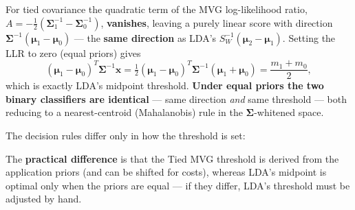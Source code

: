 For tied covariance the quadratic term of the MVG log-likelihood ratio, $A=-\tfrac12(\boldsymbol{\Sigma}_1^{-1}-\boldsymbol{\Sigma}_0^{-1})$, \textbf{vanishes}, leaving a purely linear score with direction $\boldsymbol{\Sigma}^{-1}(\boldsymbol{\mu}_1-\boldsymbol{\mu}_0)$ --- the \textbf{same direction} as LDA's $S_W^{-1}(\boldsymbol{\mu}_2-\boldsymbol{\mu}_1)$. Setting the LLR to zero (equal priors) gives
\[
(\boldsymbol{\mu}_1-\boldsymbol{\mu}_0)^T\boldsymbol{\Sigma}^{-1}\mathbf{x} = \tfrac12(\boldsymbol{\mu}_1-\boldsymbol{\mu}_0)^T\boldsymbol{\Sigma}^{-1}(\boldsymbol{\mu}_1+\boldsymbol{\mu}_0) = \frac{m_1+m_0}{2},
\]
which is exactly LDA's midpoint threshold. \textbf{Under equal priors the two binary classifiers are identical} --- same direction \emph{and} same threshold --- both reducing to a nearest-centroid (Mahalanobis) rule in the $\boldsymbol{\Sigma}$-whitened space.

The decision rules differ only in how the threshold is set:

\begin{center}
\renewcommand{\arraystretch}{1.2}
%
\end{center}

\medskip
The \textbf{practical difference} is that the Tied MVG threshold is derived from the application priors (and can be shifted for costs), whereas LDA's midpoint is optimal only when the priors are equal --- if they differ, LDA's threshold must be adjusted by hand.

